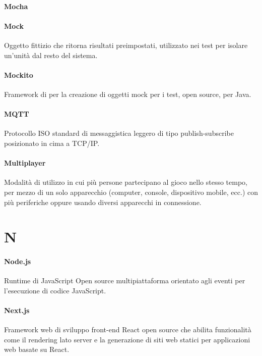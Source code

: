 \documentclass[]{article}
\begin{document}
	\paragraph*{Mocha}

    \paragraph*{Mock}
    Oggetto fittizio che ritorna risultati preimpostati, utilizzato nei test per isolare un'unità dal resto del sistema.

	\paragraph*{Mockito}
	Framework di per la creazione di oggetti mock per i test, open source, per Java.

	\paragraph*{MQTT}
	Protocollo ISO standard di messaggistica leggero di tipo publish-subscribe posizionato in cima a TCP/IP.

	\paragraph*{Multiplayer}
	Modalità di utilizzo in cui più persone partecipano al gioco nello stesso tempo, per mezzo di un solo apparecchio (computer, console, dispositivo mobile, ecc.) con più periferiche oppure usando diversi apparecchi in connessione.

	\newpage

	\section*{N}

	\paragraph*{Node.js}
	Runtime di JavaScript Open source multipiattaforma orientato agli eventi per l'esecuzione di codice JavaScript.

	\paragraph*{Next.js}
	Framework web di sviluppo front-end React open source che abilita funzionalità come il rendering lato server e la generazione di siti web statici per applicazioni web basate su React.
\end{document}
